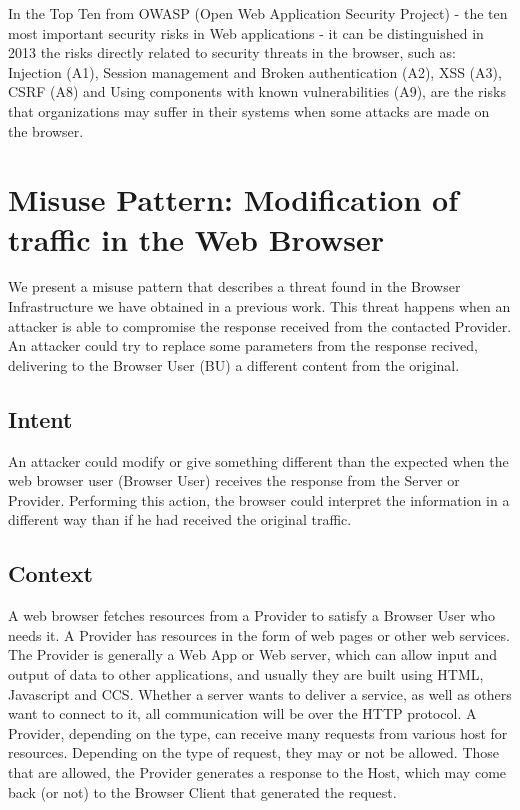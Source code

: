 \documentclass{sig-alternate-05-2015}
\begin{document}
In the Top Ten from OWASP \cite{owaspTopTen} (Open Web Application Security Project) - the ten most important security risks in Web applications - it can be distinguished in 2013 the risks directly related to security threats in the browser, such as: Injection (A1), Session management and Broken authentication (A2), XSS (A3), CSRF (A8) and Using components with known vulnerabilities (A9), are the risks that organizations may suffer in their systems when some attacks are made on the browser.


\section{Misuse Pattern: Modification of traffic in the Web Browser}
We present a misuse pattern that describes a threat found in the Browser Infrastructure we have obtained in a previous work. This threat happens when an attacker is able to compromise the response received from the contacted Provider. An attacker could try to replace some parameters from the response recived, delivering to the Browser User (BU) a different content from the original.

\subsection*{Intent}
An attacker could modify or give something different than the expected when the web browser user (Browser User) receives the response from the Server or Provider. Performing this action, the browser could interpret the information in a different way than if he had received the original traffic.

\subsection*{Context}
A web browser fetches resources from a Provider to satisfy a Browser User who needs it. A Provider has resources in the form of web pages or other web services. The Provider is generally a Web App or Web server, which can allow input and output of data to other applications, and usually they are built using HTML, Javascript and CCS. Whether a server wants to deliver a service, as well as others want to connect to it, all communication will be over the HTTP protocol. A Provider, depending on the type, can receive many requests from various host for resources. Depending on the type of request, they may or not be allowed. Those that are allowed, the Provider generates a response to the Host, which may come back (or not) to the Browser Client that generated the request.
\end{document}
